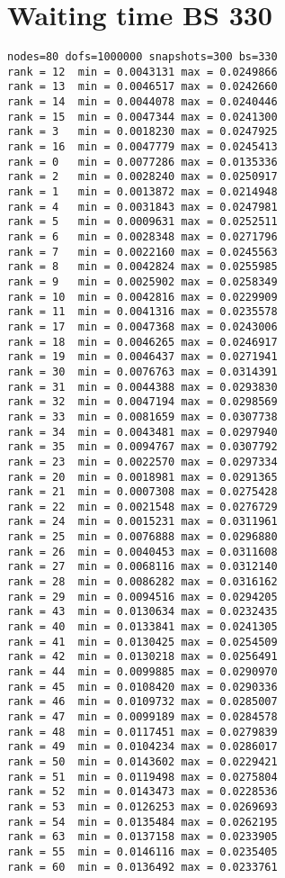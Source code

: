 \section{Waiting time BS 330}
\label{list:WTimeBS330}
\begin{lstlisting}
nodes=80 dofs=1000000 snapshots=300 bs=330
rank = 12  min = 0.0043131 max = 0.0249866
rank = 13  min = 0.0046517 max = 0.0242660
rank = 14  min = 0.0044078 max = 0.0240446
rank = 15  min = 0.0047344 max = 0.0241300
rank = 3   min = 0.0018230 max = 0.0247925
rank = 16  min = 0.0047779 max = 0.0245413
rank = 0   min = 0.0077286 max = 0.0135336
rank = 2   min = 0.0028240 max = 0.0250917
rank = 1   min = 0.0013872 max = 0.0214948
rank = 4   min = 0.0031843 max = 0.0247981
rank = 5   min = 0.0009631 max = 0.0252511
rank = 6   min = 0.0028348 max = 0.0271796
rank = 7   min = 0.0022160 max = 0.0245563
rank = 8   min = 0.0042824 max = 0.0255985
rank = 9   min = 0.0025902 max = 0.0258349
rank = 10  min = 0.0042816 max = 0.0229909
rank = 11  min = 0.0041316 max = 0.0235578
rank = 17  min = 0.0047368 max = 0.0243006
rank = 18  min = 0.0046265 max = 0.0246917
rank = 19  min = 0.0046437 max = 0.0271941
rank = 30  min = 0.0076763 max = 0.0314391
rank = 31  min = 0.0044388 max = 0.0293830
rank = 32  min = 0.0047194 max = 0.0298569
rank = 33  min = 0.0081659 max = 0.0307738
rank = 34  min = 0.0043481 max = 0.0297940
rank = 35  min = 0.0094767 max = 0.0307792
rank = 23  min = 0.0022570 max = 0.0297334
rank = 20  min = 0.0018981 max = 0.0291365
rank = 21  min = 0.0007308 max = 0.0275428
rank = 22  min = 0.0021548 max = 0.0276729
rank = 24  min = 0.0015231 max = 0.0311961
rank = 25  min = 0.0076888 max = 0.0296880
rank = 26  min = 0.0040453 max = 0.0311608
rank = 27  min = 0.0068116 max = 0.0312140
rank = 28  min = 0.0086282 max = 0.0316162
rank = 29  min = 0.0094516 max = 0.0294205
rank = 43  min = 0.0130634 max = 0.0232435
rank = 40  min = 0.0133841 max = 0.0241305
rank = 41  min = 0.0130425 max = 0.0254509
rank = 42  min = 0.0130218 max = 0.0256491
rank = 44  min = 0.0099885 max = 0.0290970
rank = 45  min = 0.0108420 max = 0.0290336
rank = 46  min = 0.0109732 max = 0.0285007
rank = 47  min = 0.0099189 max = 0.0284578
rank = 48  min = 0.0117451 max = 0.0279839
rank = 49  min = 0.0104234 max = 0.0286017
rank = 50  min = 0.0143602 max = 0.0229421
rank = 51  min = 0.0119498 max = 0.0275804
rank = 52  min = 0.0143473 max = 0.0228536
rank = 53  min = 0.0126253 max = 0.0269693
rank = 54  min = 0.0135484 max = 0.0262195
rank = 63  min = 0.0137158 max = 0.0233905
rank = 55  min = 0.0146116 max = 0.0235405
rank = 60  min = 0.0136492 max = 0.0233761

\end{lstlisting}
